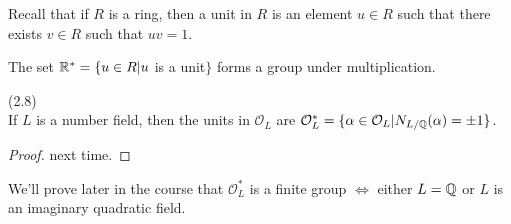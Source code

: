 \documentclass[a4paper]{article}
\begin{document}
Recall that if $R$ is a ring, then a unit in $R$ is an element $u \in R$ such that there exists $v \in R$ such that $uv = 1$.

The set $\mathbb{R}^* = \{u \in R | u $ is a unit$\}$ forms a group under multiplication.

\begin{lemma} (2.8)\\
If $L$ is a number field, then the units in $\mathcal{O}_L$ are $\mathcal{O}_L^* = \{\alpha \in \mathcal{O}_L| N_{L/\mathbb{Q}}(\alpha) = \pm 1\}$.
\begin{proof}
next time.
\end{proof}
\end{lemma}

\begin{rem}
We'll prove later in the course that $\mathcal{O}_L^*$ is a finite group $\iff$ either $L=\mathbb{Q}$ or $L$ is an imaginary quadratic field.
\end{rem}

\iffalse
\begin{equation*}
\begin{aligned}

\end{aligned}
\end{equation*}
\fi
\end{document}
